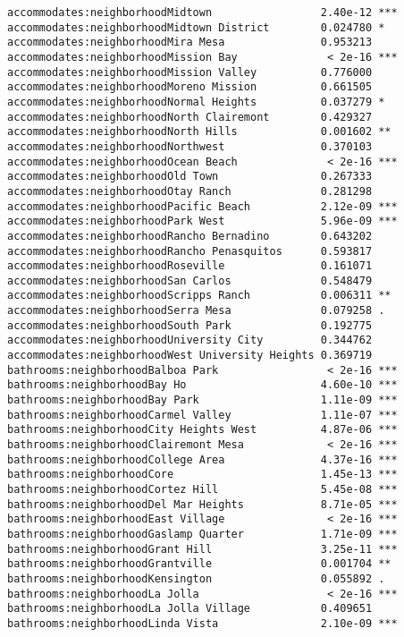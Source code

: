 \documentclass[
  letterpaper,
  krantz2]{style/krantz}
\begin{document}
\begin{verbatim}
accommodates:neighborhoodMidtown                 2.40e-12 ***
accommodates:neighborhoodMidtown District        0.024780 *  
accommodates:neighborhoodMira Mesa               0.953213    
accommodates:neighborhoodMission Bay              < 2e-16 ***
accommodates:neighborhoodMission Valley          0.776000    
accommodates:neighborhoodMoreno Mission          0.661505    
accommodates:neighborhoodNormal Heights          0.037279 *  
accommodates:neighborhoodNorth Clairemont        0.429327    
accommodates:neighborhoodNorth Hills             0.001602 ** 
accommodates:neighborhoodNorthwest               0.370103    
accommodates:neighborhoodOcean Beach              < 2e-16 ***
accommodates:neighborhoodOld Town                0.267333    
accommodates:neighborhoodOtay Ranch              0.281298    
accommodates:neighborhoodPacific Beach           2.12e-09 ***
accommodates:neighborhoodPark West               5.96e-09 ***
accommodates:neighborhoodRancho Bernadino        0.643202    
accommodates:neighborhoodRancho Penasquitos      0.593817    
accommodates:neighborhoodRoseville               0.161071    
accommodates:neighborhoodSan Carlos              0.548479    
accommodates:neighborhoodScripps Ranch           0.006311 ** 
accommodates:neighborhoodSerra Mesa              0.079258 .  
accommodates:neighborhoodSouth Park              0.192775    
accommodates:neighborhoodUniversity City         0.344762    
accommodates:neighborhoodWest University Heights 0.369719    
bathrooms:neighborhoodBalboa Park                 < 2e-16 ***
bathrooms:neighborhoodBay Ho                     4.60e-10 ***
bathrooms:neighborhoodBay Park                   1.11e-09 ***
bathrooms:neighborhoodCarmel Valley              1.11e-07 ***
bathrooms:neighborhoodCity Heights West          4.87e-06 ***
bathrooms:neighborhoodClairemont Mesa             < 2e-16 ***
bathrooms:neighborhoodCollege Area               4.37e-16 ***
bathrooms:neighborhoodCore                       1.45e-13 ***
bathrooms:neighborhoodCortez Hill                5.45e-08 ***
bathrooms:neighborhoodDel Mar Heights            8.71e-05 ***
bathrooms:neighborhoodEast Village                < 2e-16 ***
bathrooms:neighborhoodGaslamp Quarter            1.71e-09 ***
bathrooms:neighborhoodGrant Hill                 3.25e-11 ***
bathrooms:neighborhoodGrantville                 0.001704 ** 
bathrooms:neighborhoodKensington                 0.055892 .  
bathrooms:neighborhoodLa Jolla                    < 2e-16 ***
bathrooms:neighborhoodLa Jolla Village           0.409651    
bathrooms:neighborhoodLinda Vista                2.10e-09 ***

\end{verbatim}
\end{document}

